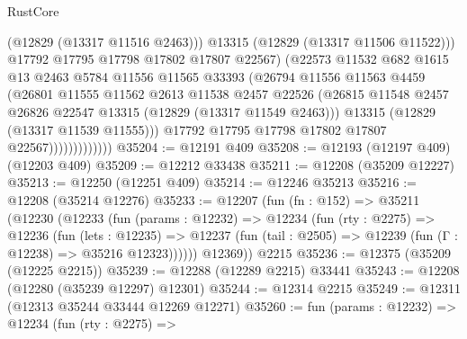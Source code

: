 \begin{lexlean}{RustCore}
\begin{coremodule}
                                (@12829 (@13317 @11516 @2463)))
                              @13315
                              (@12829 (@13317 @11506 @11522)))
                            @17792
                            @17795
                            @17798
                            @17802
                            @17807
                            @22567)
                          (@22573
                            @11532
                            @682
                            @1615
                            @13
                            @2463
                            @5784
                            @11556
                            @11565
                            @33393
                            (@26794
                              @11556
                              @11563
                              @4459
                              (@26801
                                @11555
                                @11562
                                @2613
                                @11538
                                @2457
                                @22526
                                (@26815
                                  @11548
                                  @2457
                                  @26826
                                  @22547
                                  @13315
                                  (@12829 (@13317 @11549 @2463)))
                                @13315
                                (@12829 (@13317 @11539 @11555)))
                              @17792
                              @17795
                              @17798
                              @17802
                              @17807
                              @22567)))))))))))))
@35204 := @12191 @409
@35208 := @12193 (@12197 @409) (@12203 @409)
@35209 := @12212 @33438
@35211 := @12208 (@35209 @12227)
@35213 := @12250 (@12251 @409)
@35214 := @12246 @35213
@35216 := @12208 (@35214 @12276)
@35233 := @12207
    (fun (fn : @152) =>
    @35211
      (@12230
        (@12233
          (fun (params : @12232) =>
          @12234
            (fun (rty : @2275) =>
            @12236
              (fun (lets : @12235) =>
              @12237 (fun (tail : @2505) => @12239 (fun (Γ : @12238) => @35216 @12323))))))
        @12369))
    @2215
@35236 := @12375 (@35209 (@12225 @2215))
@35239 := @12288 (@12289 @2215) @33441
@35243 := @12208 (@12280 (@35239 @12297) @12301)
@35244 := @12314 @2215
@35249 := @12311 (@12313 @35244 @33444 @12269 @12271)
@35260 := fun (params : @12232) =>
  @12234
    (fun (rty : @2275) =>

\end{coremodule}
\end{lexlean}
